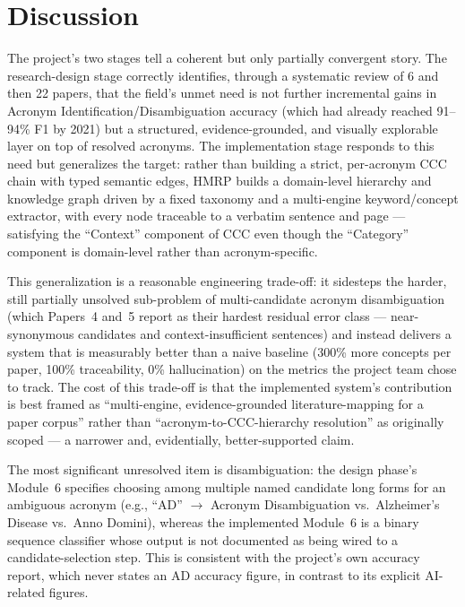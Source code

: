 \documentclass[10pt,conference]{IEEEtran}
\begin{document}
\section{Discussion}
\label{sec:discussion}
The project's two stages tell a coherent but only partially convergent story. The research-design stage correctly identifies, through a systematic review of 6 and then 22 papers, that the field's unmet need is not further incremental gains in Acronym Identification/Disambiguation accuracy (which had already reached 91--94\% F1 by 2021) but a structured, evidence-grounded, and visually explorable layer on top of resolved acronyms. The implementation stage responds to this need but generalizes the target: rather than building a strict, per-acronym CCC chain with typed semantic edges, HMRP builds a domain-level hierarchy and knowledge graph driven by a fixed taxonomy and a multi-engine keyword/concept extractor, with every node traceable to a verbatim sentence and page --- satisfying the ``Context'' component of CCC even though the ``Category'' component is domain-level rather than acronym-specific.

This generalization is a reasonable engineering trade-off: it sidesteps the harder, still partially unsolved sub-problem of multi-candidate acronym disambiguation (which Papers~4 and~5 report as their hardest residual error class --- near-synonymous candidates and context-insufficient sentences) and instead delivers a system that is measurably better than a naive baseline (300\% more concepts per paper, 100\% traceability, 0\% hallucination) on the metrics the project team chose to track. The cost of this trade-off is that the implemented system's contribution is best framed as ``multi-engine, evidence-grounded literature-mapping for a paper corpus'' rather than ``acronym-to-CCC-hierarchy resolution'' as originally scoped --- a narrower and, evidentially, better-supported claim.

The most significant unresolved item is disambiguation: the design phase's Module~6 specifies choosing among multiple named candidate long forms for an ambiguous acronym (e.g., ``AD'' $\rightarrow$ Acronym Disambiguation vs.\ Alzheimer's Disease vs.\ Anno Domini), whereas the implemented Module~6 is a binary sequence classifier whose output is not documented as being wired to a candidate-selection step. This is consistent with the project's own accuracy report, which never states an AD accuracy figure, in contrast to its explicit AI-related figures.
\end{document}
